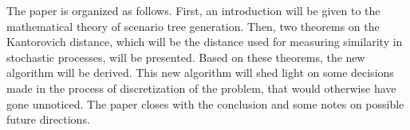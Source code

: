 \documentclass[12pt,onecolumn,headsepline,numbers=noenddot,bibliography=totoc,oneside,a4paper,fleqn,BCOR8mm] {scrartcl}
\begin{document}
The paper is organized as follows. First, an introduction will be given to the mathematical theory of scenario tree generation. Then, two theorems on the Kantorovich distance, which will be the distance used for measuring similarity in stochastic processes, will be presented. Based on these theorems, the new algorithm will be derived. This new algorithm will shed light on some decisions made in the process of discretization of the problem, that would otherwise have gone unnoticed. The paper closes with the conclusion and some notes on possible future directions.
\begin{comment}
\section{Stochastic Programming Theory}
Consider the following real world problem:

An operator in charge of a pumped hydro plant at any given time wants to make the optimal decision whether to pump water up into his reservoir with electrical power purchased at current spot market prices, do nothing, or release water from the reservoir and sell it at the spot market.

For an introduction into the general theory see \cite{Birge1997}. For a more recent overview on optimization under uncertainty, see \cite{Sahinidis2004} and the references therein.

The generation of the scenario tree is a key step in the solution of stochastic programming problems.

In this paper we will present several ways to generate said scenario trees. The section is organized as follows. First, a short introduction to the basic mathematical theory will be given that is necessary to follow the derivations of the algorithms. Then, the state of the art in solving this problem is summarized. Finally, several new algorithms are derived. These new algorithms will differ from the ones proposed in the literature in that they attempt to solve the original problem to full optimality. The section will close with a discussion and comparison of the results of the presented algorithms.
\end{comment}

\end{document}
